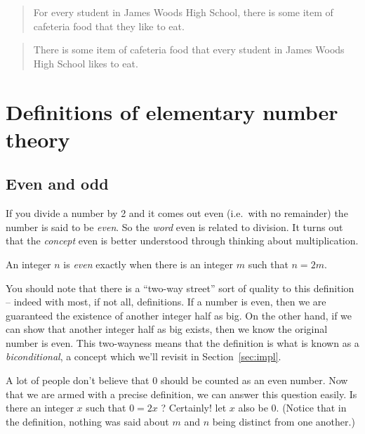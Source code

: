 \begin{quote}
For every student in James Woods High School, there is some item of
cafeteria food that they like to eat.
\end{quote}

\begin{quote}
There is some item of cafeteria food that every student in James Woods 
High School likes to eat.
\end{quote}

\newpage





\newpage

\section{Definitions of elementary number theory}
\label{sec:num_thry}

\subsection{Even and odd}
\label{even_n_odd}

If you divide a number by 2 and it comes out even (i.e.\ with
no remainder) the number is said to be {\em even}.  So the 
{\em word} even is related to division.  It turns out that the
{\em concept} even is better understood through thinking about
multiplication.

\begin{defi}
An integer $n$ is {\em even} exactly when there is an integer $m$
such that $n = 2m$.
\end{defi}

You should note that there is a ``two-way street'' sort of quality
to this definition -- indeed with most, if not all, definitions.  If 
a number is even, then we are guaranteed the existence of another
integer half as big.  On the other hand, if we can show that another
integer half as big exists, then we know the original number is even.
This two-wayness means that the definition is what is known as a 
{\em biconditional}, a concept which we'll revisit in
Section~\ref{sec:impl}.  

A lot of people don't believe that $0$ should be counted as an even
number.  Now that we are armed with a precise definition, we can
answer this question easily.  Is there an integer $x$ such that
$0 = 2x$ ?  Certainly! let $x$ also be $0$.  (Notice that in the
definition, nothing was said about $m$ and $n$ being distinct from
one another.)  

